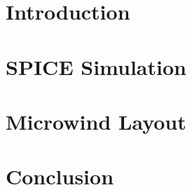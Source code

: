 \documentclass{article}
\begin{document}
\begin{titlepage}

\end{titlepage}
\section{Introduction}

\section{SPICE Simulation}

\section{Microwind Layout}

\section{Conclusion}

\end{document}
